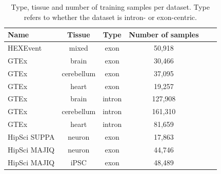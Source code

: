 \begin{table}[h!]
	\centering
	\begin{tabular}{l | c c | c c c} 
		\toprule
		Name & Tissue & Type & Number of samples\\
		\toprule
		HEXEvent & mixed & exon & 50,918 \\
		\hline
		GTEx & brain & exon & 30,466\\
		GTEx & cerebellum & exon & 37,095\\
		GTEx & heart & exon & 19,257\\
		\hline
		GTEx & brain & intron & 127,908\\
		GTEx & cerebellum & intron & 161,310\\
		GTEx & heart & intron & 81,659\\
		\hline
		HipSci SUPPA & neuron & exon & 17,863 \\
		HipSci MAJIQ & neuron & exon & 44,746 \\
		HipSci MAJIQ & iPSC & exon & 48,489 \\
		\hline
		
	\end{tabular}
	\caption{Type, tissue and number of training samples per dataset. Type refers to whether the dataset is intron- or exon-centric.
	}
	\label{table:datasets}
\end{table}


